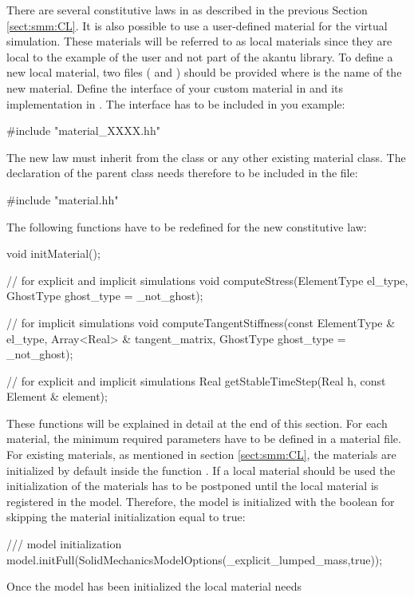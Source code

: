 There are several constitutive laws in \akantu as described in the
previous Section \ref{sect:smm:CL}. It is also possible to use a
user-defined material for the virtual simulation. These materials will
be referred to as local materials since they are local to the example
of the user and not part of the akantu library.  To define a new local
material, two files ( and
) should be provided where  is the
name of the new material. Define the interface of your custom material
in  and its implementation in
. The interface has to be included in you example:
\begin{cpp}
#include "material\_XXXX.hh"
\end{cpp}
 The new law must inherit from the
 class or any other existing material class. The
declaration of the parent class needs therefore to be included in the
 file:
\begin{cpp} 
#include "material.hh"
\end{cpp}
The following functions have to be redefined for the new constitutive
law:
\begin{cpp} 
void initMaterial();

// for explicit and implicit simulations void
computeStress(ElementType el_type, GhostType ghost_type = _not_ghost);

// for implicit simulations void computeTangentStiffness(const
ElementType & el_type, Array<Real> & tangent_matrix, GhostType ghost_type = _not_ghost);

// for explicit and implicit simulations Real getStableTimeStep(Real
h, const Element & element);
\end{cpp} 
These functions will be explained in detail at the end of
this section.  For each material, the minimum required parameters have
to be defined in a material file.  For existing materials, as
mentioned in section \ref{sect:smm:CL}, the materials are initialized
by default inside the function . If a local material
should be used the initialization of the materials has to be postponed
until the local material is registered in the model. Therefore, the
model is initialized with the boolean for skipping the material
initialization equal to true:
\begin{cpp} 
/// model initialization
model.initFull(SolidMechanicsModelOptions(_explicit_lumped_mass,true));
\end{cpp} 
Once the model has been initialized the local material needs
